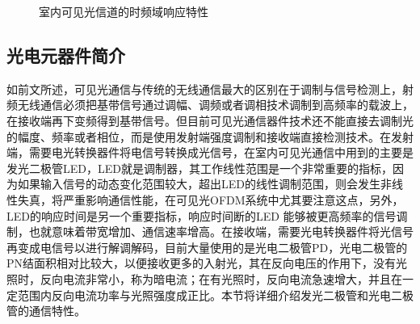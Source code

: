 \begin{figure}[h]
{\begin{minipage}[t]{0.5\textwidth}
        \end{minipage}
    }
    \caption{室内可见光信道的时频域响应特性}
    \label{fig:ChannelResponse}
\end{figure}

\subsection{光电元器件简介}
如前文所述，可见光通信与传统的无线通信最大的区别在于调制与信号检测上，射频无线通信必须把基带信号通过调幅、调频或者调相技术调制到高频率的载波上，在接收端再下变频得到基带信号。但目前可见光通信器件技术还不能直接去调制光的幅度、频率或者相位，而是使用发射端强度调制和接收端直接检测技术。在发射端，需要电光转换器件将电信号转换成光信号，在室内可见光通信中用到的主要是发光二极管LED，LED就是调制器，其工作线性范围是一个非常重要的指标，因为如果输入信号的动态变化范围较大，超出LED的线性调制范围，则会发生非线性失真，将严重影响通信性能，在可见光OFDM系统中尤其要注意这点，另外，LED的响应时间是另一个重要指标，响应时间断的LED 能够被更高频率的信号调制，也就意味着带宽增加、通信速率增高。在接收端，需要光电转换器件将光信号再变成电信号以进行解调解码，目前大量使用的是光电二极管PD，光电二极管的PN结面积相对比较大，以便接收更多的入射光，其在反向电压的作用下，没有光照时，反向电流非常小，称为暗电流；在有光照时，反向电流急速增大，并且在一定范围内反向电流功率与光照强度成正比。本节将详细介绍发光二极管和光电二极管的通信特性。
